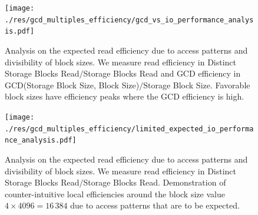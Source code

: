 \documentclass[twocolumn]{article}
\begin{document}
\begin{figure}[htb]
	\begin{minipage}{0.475 \textwidth}
	\centering
	\texttt{[image: ./res/gcd\_multiples\_efficiency/gcd\_vs\_io\_performance\_analysis.pdf]}
	\caption{Analysis on the expected read efficiency due to access patterns and divisibility of block sizes. We measure read efficiency in Distinct Storage Blocks Read\( / \)Storage Blocks Read and 
	GCD efficiency in GCD(Storage Block Size, Block Size)\( / \)Storage Block Size. Favorable block sizes have efficiency peaks where the GCD efficiency is high. }
	\label{fig:gcd_vs_io_performance_analysis.pdf}
\end{minipage}
\end{figure}

\begin{figure}[htb]
	\begin{minipage}{0.475 \textwidth}
	\centering
	\texttt{[image: ./res/gcd\_multiples\_efficiency/limited\_expected\_io\_performance\_analysis.pdf]}
	\caption{Analysis on the expected read efficiency due to access patterns and divisibility of block sizes. We measure read efficiency in Distinct Storage Blocks Read\( / \)Storage Blocks Read. Demonstration of 
	counter-intuitive local efficiencies around the block size value \( 4 \times 4096 = 16\,384 \) due to access patterns that are to be expected. }
	\label{fig:limited_expected_io_performance_analysis.pdf}
\end{minipage}
\end{figure}
\end{document}
